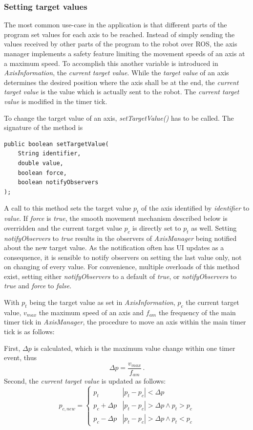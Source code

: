 \subsubsection{Setting target values}

The most common use-case in the application is that different parts of the program set values for each axis to be reached. Instead of simply sending the values received by other parts of the program to the robot over ROS, the axis manager implements a safety feature limiting the movement speeds of an axis at a maximum speed. To accomplish this another variable is introduced in \textit{AxisInformation}, the \textit{current target value}. While the \textit{target value} of an axis determines the desired position where the axis shall be at the end, the \textit{current target value} is the value which is actually sent to the robot. The \textit{current target value} is modified in the timer tick.

To change the target value of an axis, \textit{setTargetValue()} has to be called. The signature of the method is
\begin{lstlisting}[caption={Signature of setTargetValue()}, label=lst:impl:settargetval]
public boolean setTargetValue(
	String identifier, 
	double value, 
	boolean force,
	boolean notifyObservers
);
\end{lstlisting}
A call to this method sets the target value $p_t$ of the axis identified by \textit{identifier} to \textit{value}. If \textit{force} is \textit{true}, the smooth movement mechanism described below is overridden and the current target value $p_c$ is directly set to $p_t$ as well. Setting \textit{notifyObservers} to \textit{true} results in the observers of \textit{AxisManager} being notified about the new target value. As the notification often has UI updates as a consequence, it is sensible to notify observers on setting the last value only, not on changing of every value. For convenience, multiple overloads of this method exist, setting either \textit{notifyObservers} to a default of \textit{true}, or \textit{notifyObservers} to \textit{true} and \textit{force} to \textit{false}.

With $p_t$ being the target value as set in \textit{AxisInformation}, $p_c$ the current target value, $v_{max}$ the maximum speed of an axis and $f_{am}$ the frequency of the main timer tick in \textit{AxisManager}, the procedure to move an axis within the main timer tick is as follows:

First, $\Delta p$ is calculated, which is the maximum value change within one timer event, thus
\begin{equation*}
\Delta p = \frac{v_{max}}{f_{am}} \, .
\end{equation*}
Second, the \textit{current target value} is updated as follows:
\begin{equation*}
p_{c,new} = \left\{ 
\begin{array}{ll}
p_t & |p_t - p_c| < \Delta p \\
p_c + \Delta p & |p_t - p_c| > \Delta p \land p_t > p_c \\
p_c - \Delta p & |p_t - p_c| > \Delta p \land p_t < p_c
\end{array}
 \right.
\end{equation*}

